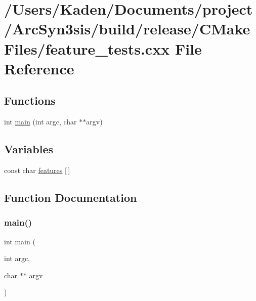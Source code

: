 \hypertarget{a00831}{}\section{/\+Users/\+Kaden/\+Documents/project/\+Arc\+Syn3sis/build/release/\+C\+Make\+Files/feature\+\_\+tests.cxx File Reference}
\label{a00831}
\subsection*{Functions}
\begin{DoxyCompactItemize}
\item 
int \hyperlink{a00831_a3c04138a5bfe5d72780bb7e82a18e627}{main} (int argc, char $\ast$$\ast$argv)
\end{DoxyCompactItemize}
\subsection*{Variables}
\begin{DoxyCompactItemize}
\item 
const char \hyperlink{a00831_a1582568e32f689337602a16bf8a5bff0}{features} \mbox{[}$\,$\mbox{]}
\end{DoxyCompactItemize}


\subsection{Function Documentation}
\mbox{\label{a00831_a3c04138a5bfe5d72780bb7e82a18e627}} 
\subsubsection{\texorpdfstring{main()}{main()}}
{\footnotesize\ttfamily int main (\begin{DoxyParamCaption}\item[{int}]{argc,  }\item[{char $\ast$$\ast$}]{argv }\end{DoxyParamCaption})}



